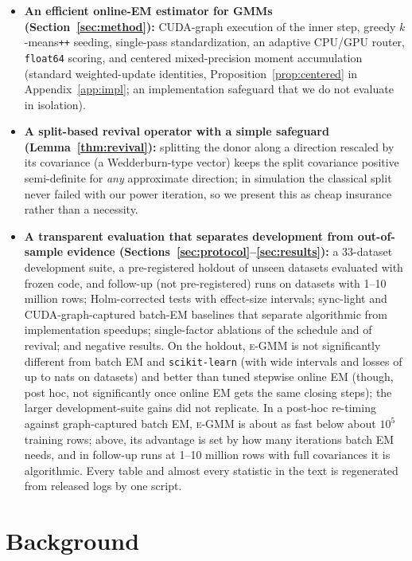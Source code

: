 \documentclass[10pt]{article} %
\newcommand{\egmm}{\textsc{e-GMM}}
\begin{document}
\begin{itemize}[leftmargin=*,nosep]
  \item \textbf{An efficient online-EM estimator for GMMs (Section~\ref{sec:method}):} CUDA-graph execution of the inner step, greedy $k$-means\texttt{++} seeding, single-pass standardization, an adaptive CPU/GPU router, \texttt{float64} scoring, and centered mixed-precision moment accumulation (standard weighted-update identities, Proposition~\ref{prop:centered} in Appendix~\ref{app:impl}; an implementation safeguard that we do not evaluate in isolation).
  \item \textbf{A split-based revival operator with a simple safeguard (Lemma~\ref{thm:revival}):} splitting the donor along a direction rescaled by its covariance (a Wedderburn-type vector) keeps the split covariance positive semi-definite for \emph{any} approximate direction; in simulation the classical split never failed with our power iteration, so we present this as cheap insurance rather than a necessity.
  \item \textbf{A transparent evaluation that separates development from out-of-sample evidence (Sections~\ref{sec:protocol}--\ref{sec:results}):} a 33-dataset development suite, a pre-registered holdout of \rnHoldout{} unseen datasets evaluated with frozen code, and follow-up (not pre-registered) runs on \rSnLg{} datasets with 1--10 million rows; Holm-corrected tests with effect-size intervals; sync-light and CUDA-graph-captured batch-EM baselines that separate algorithmic from implementation speedups; single-factor ablations of the schedule and of revival; and negative results. On the holdout, \egmm{} is not significantly different from batch EM and \texttt{scikit-learn} (with wide intervals and losses of up to \rRTorchBatchGMMBigLossMax{} nats on \rRTorchBatchGMMNBigLoss{} datasets) and better than tuned stepwise online EM (though, post hoc, not significantly once online EM gets the same closing steps); the larger development-suite gains did not replicate. In a post-hoc re-timing against graph-captured batch EM, \egmm{} is about as fast below about $10^5$ training rows; above, its advantage is set by how many iterations batch EM needs, and in follow-up runs at 1--10 million rows with full covariances it is algorithmic. Every table and almost every statistic in the text is regenerated from released logs by one script.
\end{itemize}

\section{Background}
\label{sec:background}
\end{document}
